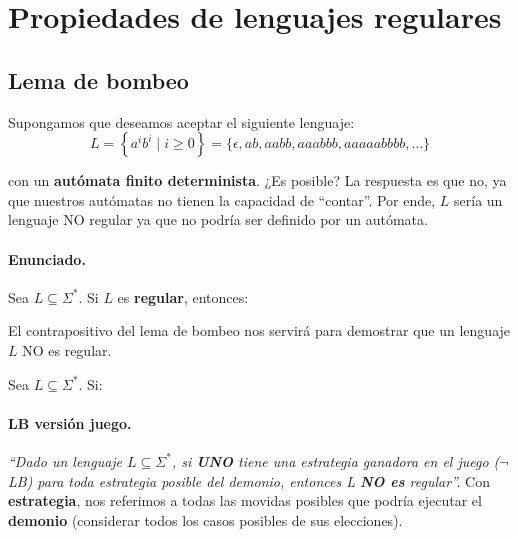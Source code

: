 \section{Propiedades de lenguajes regulares}

\subsection{Lema de bombeo}

Supongamos que deseamos aceptar el siguiente lenguaje:
$$
    L =\left\{a^i b^i \mid i \geq 0\right\} = \{\epsilon, ab, aabb, aaabbb, aaaaabbbb, \ldots\}
$$

con un \textbf{autómata finito determinista}. ¿Es posible? La respuesta es que no, ya que nuestros autómatas no tienen la capacidad de ``contar''. Por ende, $L$ sería un lenguaje NO regular ya que no podría ser definido por un autómata.

\paragraph{Enunciado.} Sea $L \subseteq \Sigma^*$. Si $L$ es \textbf{regular}, entonces:

El contrapositivo del lema de bombeo nos servirá para demostrar que un lenguaje $L$ NO es regular. \medbreak

Sea $L \subseteq \Sigma^*$. Si:


\paragraph{LB versión juego.} \textit{``Dado un lenguaje $L \subseteq \Sigma^*$, si \textbf{UNO} tiene una estrategia ganadora en el juego ($\neg$LB) para toda estrategia posible del demonio, entonces L \textbf{NO es} regular''.} Con \textbf{estrategia}, nos referimos a todas las movidas posibles que podría ejecutar el \textbf{demonio} (considerar todos los casos posibles de sus elecciones).


